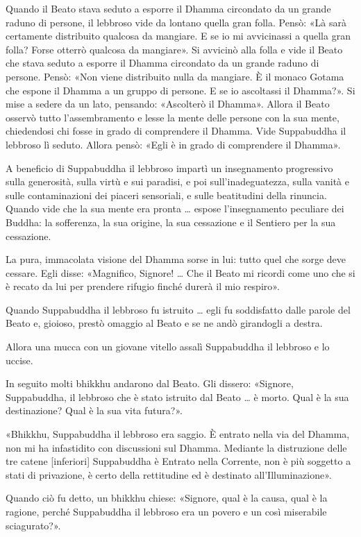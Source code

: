 Quando il Beato stava seduto a esporre il Dhamma circondato da un grande raduno
di persone, il lebbroso vide da lontano quella gran folla. Pensò: «Là sarà
certamente distribuito qualcosa da mangiare. E se io mi avvicinassi a quella
gran folla? Forse otterrò qualcosa da mangiare». Si avvicinò alla folla e vide
il Beato che stava seduto a esporre il Dhamma circondato da un grande raduno di
persone. Pensò: «Non viene distribuito nulla da mangiare. È il monaco Gotama che
espone il Dhamma a un gruppo di persone. E se io ascoltassi il Dhamma?». Si mise
a sedere da un lato, pensando: «Ascolterò il Dhamma». Allora il Beato osservò
tutto l’assembramento e lesse la mente delle persone con la sua mente,
chiedendosi chi fosse in grado di comprendere il Dhamma. Vide Suppabuddha il
lebbroso lì seduto. Allora pensò: «Egli è in grado di comprendere il Dhamma».

A beneficio di Suppabuddha il lebbroso impartì un insegnamento progressivo sulla
generosità, sulla virtù e sui paradisi, e poi sull’inadeguatezza, sulla vanità e
sulle contaminazioni dei piaceri sensoriali, e sulle beatitudini della rinuncia.
Quando vide che la sua mente era pronta … espose l’insegnamento peculiare dei
Buddha: la sofferenza, la sua origine, la sua cessazione e il Sentiero per la
sua cessazione.

La pura, immacolata visione del Dhamma sorse in lui: tutto quel che sorge deve
cessare. Egli disse: «Magnifico, Signore! … Che il Beato mi ricordi come uno che
si è recato da lui per prendere rifugio finché durerà il mio respiro».

Quando Suppabuddha il lebbroso fu istruito … egli fu soddisfatto dalle parole
del Beato e, gioioso, prestò omaggio al Beato e se ne andò girandogli a destra.

Allora una mucca con un giovane vitello assalì Suppabuddha il lebbroso e lo
uccise.

In seguito molti bhikkhu andarono dal Beato. Gli dissero: «Signore, Suppabuddha,
il lebbroso che è stato istruito dal Beato … è morto. Qual è la sua
destinazione? Qual è la sua vita futura?».

«Bhikkhu, Suppabuddha il lebbroso era saggio. È entrato nella via del Dhamma,
non mi ha infastidito con discussioni sul Dhamma. Mediante la distruzione delle
tre catene [inferiori] Suppabuddha è Entrato nella Corrente, non è più soggetto
a stati di privazione, è certo della rettitudine ed è destinato
all’Illuminazione».

Quando ciò fu detto, un bhikkhu chiese: «Signore, qual è la causa, qual è la
ragione, perché Suppabuddha il lebbroso era un povero e un così miserabile
sciagurato?».

